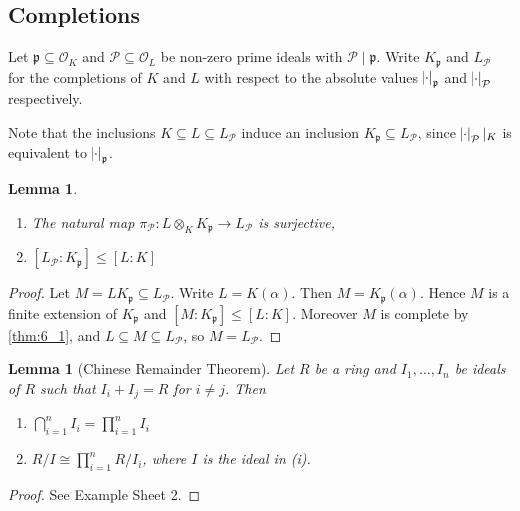 \documentclass[11pt]{article}
\theoremstyle{definition}
\theoremstyle{plain}
\newtheorem{lemma}[definition]{Lemma}
\theoremstyle{remark}
\newcommand{\cO}{\mathcal{O}}
\newcommand{\cP}{\mathcal{P}}
\newcommand{\fp}{\mathfrak{p}}
\begin{document}
\subsection*{Completions}

Let $\fp \subseteq \cO_K$ and $\cP \subseteq \cO_L$ be non-zero prime ideals with $\cP \mid \fp$. Write $K_\fp$ and $L_\cP$ for the completions of $K$ and $L$ with respect to the absolute values $\abs{\cdot}_\fp$ and $\abs{\cdot}_\cP$ respectively.

Note that the inclusions $K \subseteq L \subseteq L_\cP$ induce an inclusion $K_\fp \subseteq L_\cP$, since $\abs{\cdot}_\cP \vert_K$ is equivalent to $\abs{\cdot}_\fp$.

\begin{lemma}\label{lem:10_7}\phantom{}
    \begin{enumerate}
        \item The natural map $\pi_\cP : L \otimes_K K_\fp \to L_\cP$ is surjective,
        \item $[L_\cP : K_\fp] \le [L : K]$
    \end{enumerate}
\end{lemma}
\begin{proof}
    Let $M = L K_\fp \subseteq L_\cP$. Write $L = K(\alpha)$. Then $M = K_\fp(\alpha)$. Hence $M$ is a finite extension of $K_\fp$ and $[M : K_\fp] \le [L : K]$. Moreover $M$ is complete by \autoref{thm:6_1}, and $L \subseteq M \subseteq L_\cP$, so $M = L_\cP$.
\end{proof}

\begin{lemma}[Chinese Remainder Theorem]\label{lem:10_8}
    Let $R$ be a ring and $I_1, \ldots, I_n$ be ideals of $R$ such that $I_i + I_j = R$ for $i \neq j$. Then
    \begin{enumerate}
        \item $\bigcap_{i=1}^n I_i = \prod_{i=1}^n I_i$
        \item $R / I \cong \prod_{i=1}^n R/I_i$, where $I$ is the ideal in (i).
    \end{enumerate}
\end{lemma}
\begin{proof}
    See Example Sheet 2.
\end{proof}
\end{document}
